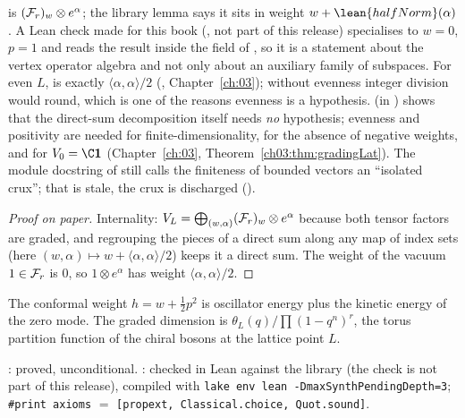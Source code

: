 \begin{dictionary}
 is $(\mathcal{F}_r)_w\otimes e^\alpha$; the library lemma says it sits in weight
$w+\lean{halfNorm}(\alpha)$. A Lean check made for this book (, not part of this release) specialises to
$w=0$, $p=1$ and reads the result inside the
 field of , so it is a statement about the vertex operator algebra and not only
about an auxiliary family of subspaces. For even $L$,  is exactly $\langle\alpha,\alpha\rangle/2$
(, Chapter~\ref{ch:03}); without evenness integer division would round, which is one of the
reasons evenness is a hypothesis.  (in )
shows that the direct-sum decomposition itself needs \emph{no} hypothesis; evenness and positivity are needed for
finite-dimensionality, for the absence of negative weights, and for $V_0=\C\lfivevac$
(Chapter~\ref{ch:03}, Theorem~\ref{ch03:thm:gradingLat}). The module docstring of
 still calls the finiteness of bounded vectors an ``isolated crux''; that is
stale, the crux is discharged ().
\end{dictionary}

\begin{proof}[Proof on paper]
Internality: $V_L=\bigoplus_{(w,\alpha)}(\mathcal{F}_r)_w\otimes e^\alpha$ because both tensor factors are graded, and
regrouping the pieces of a direct sum along any map of index sets (here $(w,\alpha)\mapsto w+\langle\alpha,\alpha\rangle/2$)
keeps it a direct sum. The weight of the vacuum $1\in\mathcal{F}_r$ is $0$, so $1\otimes e^\alpha$ has weight
$\langle\alpha,\alpha\rangle/2$.
\end{proof}

\begin{physics}
The conformal weight $h=w+\frac12p^2$ is oscillator energy plus the kinetic energy of the zero mode. The
graded dimension is $\theta_L(q)/\prod(1-q^n)^r$, the torus partition function of the chiral bosons at the
lattice point $L$.
\end{physics}

\begin{status}
: proved, unconditional. : checked in Lean against the library (the check is not part of this release),
compiled with \texttt{lake env lean -DmaxSynthPendingDepth=3}; \texttt{\#print axioms} $=$
\texttt{[propext, Classical.choice, Quot.sound]}.
\end{status}

